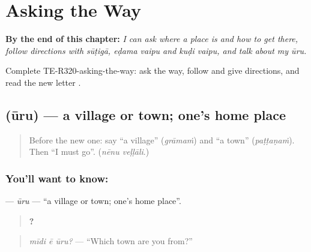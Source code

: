 
\chapter{Asking the Way}
\label{ch:te-asking-the-way}

\begin{chapteropening}
\textbf{By the end of this chapter:} \emph{I can ask where a place is and how to get there, follow directions with sūṭigā, eḍama vaipu and kuḍi vaipu, and talk about my ūru.}

Complete TE-R320-asking-the-way: ask the way, follow and give directions, and read the new letter .
\end{chapteropening}

\section[\texorpdfstring{\te{ఊరు} (ūru)}{ఊరు (ūru)}]{ (ūru) — a village or town; one's home place}

\label{lesson:TE-C320-uru}



\begin{quote}
Before the new one: say \textquotedblleft{}a village\textquotedblright{} (\emph{grāmaṁ}) and \textquotedblleft{}a town\textquotedblright{} (\emph{paṭṭaṇaṁ}). Then \textquotedblleft{}I must go\textquotedblright{}. (\emph{nēnu veḷḷāli}.)
\end{quote}

\subsection*{You'll want to know: }
\textbf{} — \emph{ūru} — \textquotedblleft{}a village or town; one's home place\textquotedblright{}.

\begin{quote}
\textbf{  ?}
\end{quote}

\begin{quote}
\emph{mīdi ē ūru?} — \textquotedblleft{}Which town are you from?\textquotedblright{}
\end{quote}

